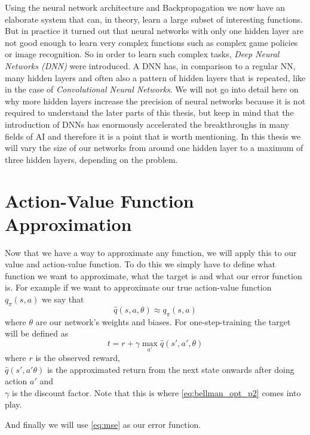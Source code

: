 Using the neural network architecture and Backpropagation we now have an elaborate system that can, in theory, learn a large subset of interesting functions.
But in practice it turned out that neural networks with only one hidden layer are not good enough to learn very complex functions such as complex game policies or image recognition.
So in order to learn such complex tasks, \emph{Deep Neural Networks (DNN)} were introduced. A DNN has, in comparison to a regular NN, many hidden layers and often also a pattern of hidden layers that is repeated, like in the case of \emph{Convolutional Neural Networks}.
We will not go into detail here on why more hidden layers increase the precision of neural networks because it is not required to understand the later parts of this thesis, but keep in mind that the introduction of DNNs has enormously accelerated the breakthroughs in many fields of AI \cite{dnn_go} and therefore it is a point that is worth mentioning.
In this thesis we will vary the size of our networks from around one hidden layer to a maximum of three hidden layers, depending on the problem.


\section{Action-Value Function Approximation}
\label{section:a_v_approx}

Now that we have a way to approximate any function, we will apply this to our value and action-value function.
To do this we simply have to define what function we want to approximate, what the target is and what our error function is.
For example if we want to approximate our true action-value function $q_{\pi}(s,a)$ we say that
\begin{equation} \label{eq:v_hat}
	\hat{q}(s,a, \theta) \approx q_{\pi}(s,a)
\end{equation}
where $\theta$ are our network's weights and biases.
For one-step-training the target will be defined as
\begin{equation} \label{eq:target}
	t = r + \gamma \max_{a'} \hat{q}(s', a', \theta)
\end{equation}
where $r$ is the observed reward,\\
$\hat{q}(s', a' \theta)$ is the approximated return from the next state onwards after doing action $a'$ and\\
$\gamma$ is the discount factor.
Note that this is where \ref{eq:bellman_opt_p2} comes into play.


And finally we will use \ref{eq:mse} as our error function.


